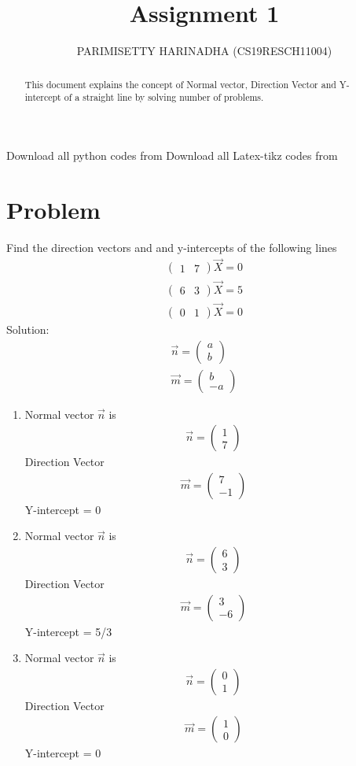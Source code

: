 \documentclass[journal,12pt,twocolumn]{IEEEtran}
\title{Assignment 1}
\author{PARIMISETTY HARINADHA (CS19RESCH11004)}
\newcommand{\myvec}[1]{\ensuremath{\begin{pmatrix}#1\end{pmatrix}}}
\begin{document}
\maketitle
\newpage
\begin{abstract}
This document explains the concept of Normal vector, Direction Vector and Y-intercept of a straight line by solving number of problems.
\end{abstract}
Download all python codes from 
Download all Latex-tikz codes from 

\section{Problem}
Find the direction vectors and and y-intercepts of the following lines
\begin{align} 
    		\myvec{ 1 & 7 } \vec{X}	= 0\\
    		\myvec{ 6 & 3 }	\vec{X}	= 5\\
		\myvec{ 0 & 1 }	\vec{X}	= 0
\end{align}
Solution:
\begin{align}
	\vec{n} = \myvec{ a \\ b }\\
	\vec{m} = \myvec{ b \\ -a }
\end{align}
\begin{enumerate}
\item Normal vector $\vec{n}$ is   \begin{align}
	\vec{n} = \myvec{ 1 \\ 7 }
\end{align}
Direction Vector
\begin{align}
		\vec{m} = \myvec{ 7 \\ -1 } 
\end {align}
Y-intercept = 0
\item Normal vector $\vec{n}$ is \begin{align}
	\vec{n} = \myvec{ 6 \\ 3 }
\end{align}
Direction Vector
\begin{align}
		\vec{m} = \myvec{ 3 \\ -6 }
\end{align} 	
Y-intercept = 5/3
\item Normal vector $\vec{n}$ is  \begin{align}
	\vec{n} = \myvec{ 0 \\ 1 }
\end{align} 
Direction Vector
\begin{align}
		\vec{m} = \myvec{ 1 \\ 0 }
\end{align}
Y-intercept =  0
\end{enumerate}
\end{document}
